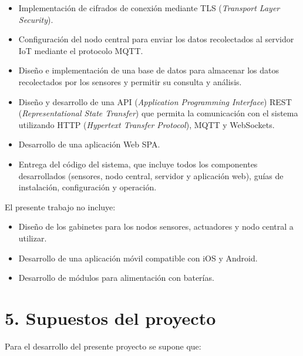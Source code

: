 \documentclass[
11pt, %
codirector, %
]{charter}
\begin{document}
\begin{itemize}
	\item Implementación de cifrados de conexión mediante TLS (\textit{Transport Layer Security}).
	\item Configuración del nodo central para enviar los datos recolectados al servidor IoT mediante el protocolo MQTT.
	\item Diseño e implementación de una base de datos para almacenar los datos recolectados por los sensores y permitir su consulta y análisis.
	\item Diseño y desarrollo de una API (\textit{Application Programming Interface}) REST (\textit{Representational State Transfer}) que permita la comunicación 
	con el sistema utilizando HTTP (\textit{Hypertext Transfer Protocol}), MQTT y WebSockets.
	\item Desarrollo de una aplicación Web SPA.
	\item Entrega del código del sistema, que incluye todos los componentes desarrollados (sensores, nodo central, servidor
	y aplicación web), guías de instalación, configuración y operación.
\end{itemize}

El presente trabajo no incluye:
\begin{itemize}
	\item Diseño de los gabinetes para los nodos sensores, actuadores y nodo central a utilizar.
	\item Desarrollo de una aplicación móvil compatible con iOS y Android.
	\item Desarrollo de módulos para alimentación con baterías.
\end{itemize}



\section{5. Supuestos del proyecto}
\label{sec:supuestos}

Para el desarrollo del presente proyecto se supone que:
\end{document}
